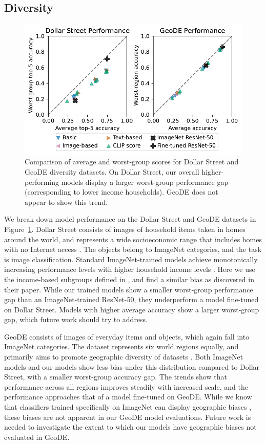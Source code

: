 \subsection{Diversity}


\begin{figure}
    \centering
    \includegraphics[width=0.7\linewidth]{figures/robustness_diversity.pdf}
    \caption{Comparison of average and worst-group scores for Dollar Street and GeoDE diversity datasets. On Dollar Street, our overall higher-performing models display a larger worst-group performance gap (corresponding to lower income households). GeoDE does not appear to show this trend.}
    \label{fig:robustness_diversity}
\end{figure}


We break down model performance on the Dollar Street and GeoDE datasets in Figure~\ref{fig:robustness_diversity}. Dollar Street consists of images of household items taken in homes around the world, and represents a wide socioeconomic range that includes homes with no Internet access \cite{rojas2022dollar}. The objects belong to ImageNet categories, and the task is image classification. Standard ImageNet-trained models achieve monotonically increasing performance levels with higher household income levels \cite{rojas2022dollar}. Here we use the income-based subgroups defined in \citet{rojas2022dollar}, and find a similar bias as discovered in their paper. While our trained models show a smaller worst-group performance gap than an ImageNet-trained ResNet-50, they underperform a model fine-tuned on Dollar Street. Models with higher average accuracy show a larger worst-group gap, which future work should try to address.

GeoDE consists of images of everyday items and objects, which again fall into ImageNet categories. The dataset represents six world regions equally, and primarily aims to promote geographic diversity of datasets \cite{ramaswamy2022geode}. Both ImageNet models and our models show less bias under this distribution compared to Dollar Street, with a smaller worst-group accuracy gap. The trends show that performance across all regions improves steadily with increased scale, and the performance approaches that of a model fine-tuned on GeoDE. While we know that classifiers trained specifically on ImageNet can display geographic biases \cite{ramaswamy2022geode}, these biases are not apparent in our GeoDE model evaluations. Future work is needed to investigate the extent to which our models have geographic biases not evaluated in GeoDE.


